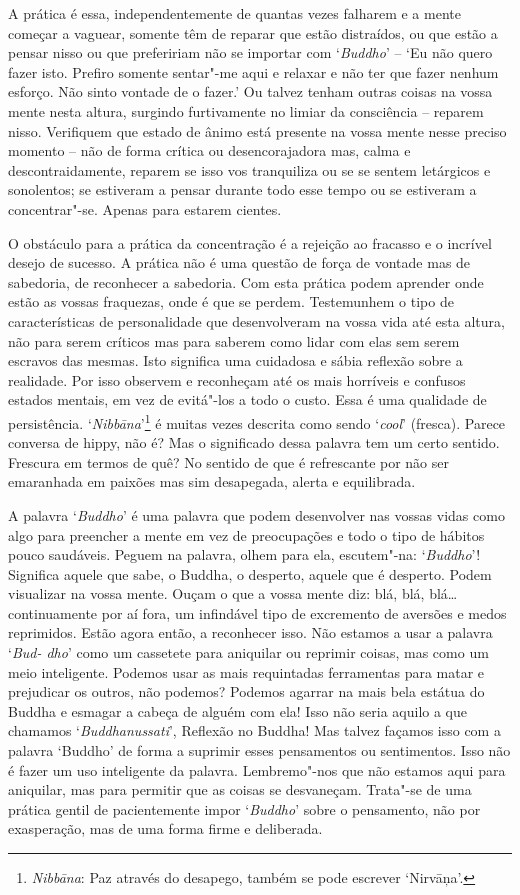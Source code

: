 A prática é essa, independentemente de quantas vezes falharem e a mente
começar a vaguear, somente têm de reparar que estão distraídos, ou que
estão a pensar nisso ou que prefeririam não se importar com
`\emph{Buddho}' -- `Eu não quero fazer isto. Prefiro somente sentar"-me
aqui e relaxar e não ter que fazer nenhum esforço. Não sinto vontade de
o fazer.' Ou talvez tenham outras coisas na vossa mente nesta altura,
surgindo furtivamente no limiar da consciência -- reparem nisso.
Verifiquem que estado de ânimo está presente na vossa mente nesse
preciso momento -- não de forma crítica ou desencorajadora mas, calma e
descontraidamente, reparem se isso vos tranquiliza ou se se sentem
letárgicos e sonolentos; se estiveram a pensar durante todo esse tempo
ou se estiveram a concentrar"-se. Apenas para estarem cientes.

O obstáculo para a prática da concentração é a rejeição ao fracasso e o
incrível desejo de sucesso. A prática não é uma questão de força de
vontade mas de sabedoria, de reconhecer a sabedoria. Com esta prática
podem aprender onde estão as vossas fraquezas, onde é que se perdem.
Testemunhem o tipo de características de personalidade que desenvolveram
na vossa vida até esta altura, não para serem críticos mas para saberem
como lidar com elas sem serem escravos das mesmas. Isto significa
uma cuidadosa e sábia reflexão sobre a realidade. Por isso observem e
reconheçam até os mais horríveis e confusos estados mentais, em vez de
evitá"-los a todo o custo. Essa é uma qualidade de persistência.
`\emph{Nibbāna}'\footnote{%
  \emph{Nibbāna}: Paz através do desapego, também se pode escrever `Nirvāņa'.}
é muitas vezes descrita como sendo `\emph{cool}'
(fresca). Parece conversa de hippy, não é? Mas o significado dessa
palavra tem um certo sentido. Frescura em termos de quê? No sentido de
que é refrescante por não ser emaranhada em paixões mas sim desapegada,
alerta e equilibrada.

A palavra `\emph{Buddho}' é uma palavra que podem desenvolver nas vossas
vidas como algo para preencher a mente em vez de preocupações e todo o
tipo de hábitos pouco saudáveis. Peguem na palavra, olhem para ela,
escutem"-na: `\emph{Buddho}'! Significa aquele que sabe, o Buddha, o
desperto, aquele que é desperto. Podem visualizar na vossa mente. Ouçam
o que a vossa mente diz: blá, blá, blá\ldots{} continuamente por aí
fora, um infindável tipo de excremento de aversões e medos reprimidos.
Estão agora então, a reconhecer isso. Não estamos a usar a palavra
`\emph{Bud- dho}' como um cassetete para aniquilar ou reprimir coisas,
mas como um meio inteligente. Podemos usar as mais requintadas
ferramentas para matar e prejudicar os outros, não podemos? Podemos
agarrar na mais bela estátua do Buddha e esmagar a cabeça de alguém com
ela! Isso não seria aquilo a que chamamos
`\emph{Buddhanussati}', Reflexão no Buddha! Mas talvez façamos isso com
a palavra `Buddho' de forma a suprimir esses pensamentos ou sentimentos.
Isso não é fazer um uso inteligente da palavra. Lembremo"-nos que não
estamos aqui para aniquilar, mas para permitir que as coisas se
desvaneçam. Trata"-se de uma prática gentil de pacientemente impor
`\emph{Buddho}' sobre o pensamento, não por exasperação, mas de uma
forma firme e deliberada.

